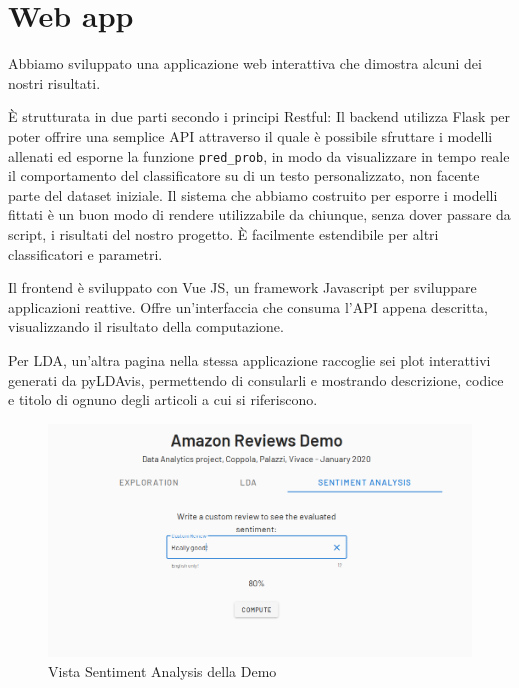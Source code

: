 \chapter{Web app}
Abbiamo sviluppato una applicazione web interattiva che dimostra alcuni dei nostri risultati.

È strutturata in due parti secondo i principi Restful: Il backend utilizza Flask per poter offrire una semplice API attraverso il quale è possibile sfruttare i modelli allenati ed esporne la funzione \texttt{pred\_prob}, in modo da visualizzare in tempo reale il comportamento del classificatore su di un testo personalizzato, non facente parte del dataset iniziale. Il sistema che abbiamo costruito per esporre i modelli fittati è un buon modo di rendere utilizzabile da chiunque, senza dover passare da script, i risultati del nostro progetto. È facilmente estendibile per altri classificatori e parametri.
\par
Il frontend è sviluppato con Vue JS, un framework Javascript per sviluppare applicazioni reattive. Offre un'interfaccia che consuma l'API appena descritta, visualizzando il risultato della computazione.
\par
Per LDA, un'altra pagina nella stessa applicazione raccoglie sei plot interattivi generati da pyLDAvis, permettendo di consularli e mostrando descrizione, codice e titolo di ognuno degli articoli a cui si riferiscono.

\begin{figure}[H]
  \centering
  \captionsetup{margin=1cm}
  \includegraphics[width=1\linewidth]{figures/ext/webapp1.png}
  \caption{Vista Sentiment Analysis della Demo}
  \label{zipf_law}
\end{figure}


